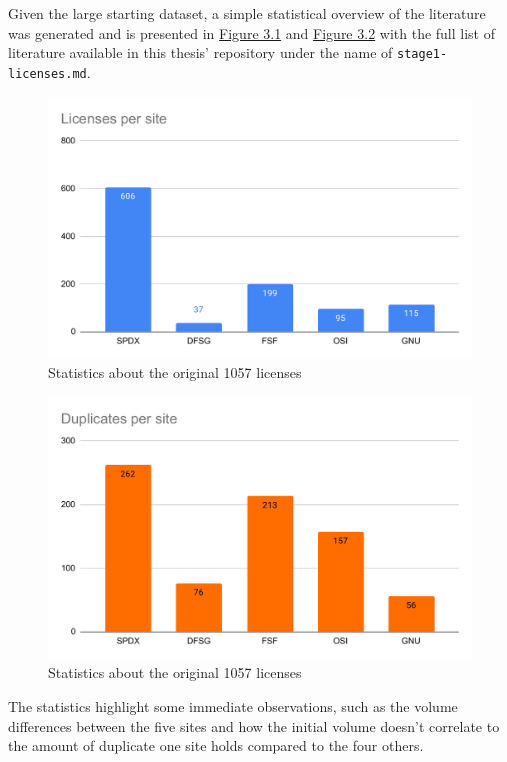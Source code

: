 Given the large starting dataset, a simple statistical overview of the literature was generated and is presented in \hyperref[fig:3-1]{Figure 3.1} and \hyperref[fig:3-2]{Figure 3.2} with the full list of literature available in this thesis' repository \citep{mscthesis} under the name of \texttt{stage1-licenses.md}.
\begin{figure}
	\centering
	\includegraphics[scale=0.67]{figures/figure-3-1.pdf}
	\caption{Statistics about the original 1057 licenses}
	\label{fig:3-1}
\end{figure}
\begin{figure}
	\centering
	\includegraphics[scale=0.67]{figures/figure-3-2.pdf}
	\caption{Statistics about the original 1057 licenses}
	\label{fig:3-2}
\end{figure}
The statistics highlight some immediate observations, such as the volume differences between the five sites and how the initial volume doesn't correlate to the amount of duplicate one site holds compared to the four others.

